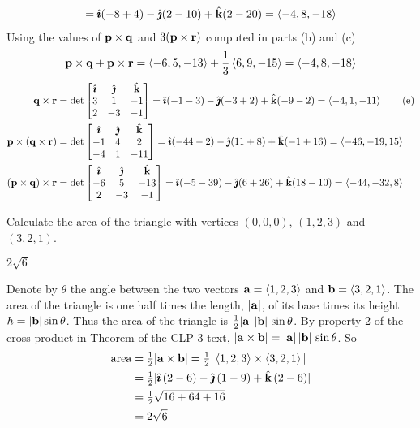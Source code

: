 \begin{solution}
\begin{align*}
=\hat{\pmb{\imath}}(-8+4)-\hat{\pmb{\jmath}}(2-10)
+\hat{\mathbf{k}}(2-20) 
=  \left< -4,8,-18\right> 
\end{align*}
{\phantom{(d)}}
Using the values of $\mathbf{p}\times\mathbf{q}$ and $3(\mathbf{p}\times\mathbf{r})$ computed
in parts (b) and (c)
\begin{equation*}
\mathbf{p}\times\mathbf{q}+\mathbf{p}\times\mathbf{r}=\left< -6,5,-13\right> +\frac{1}{3}\left< 6,9,-15\right> 
 = \left< -4,8,-18\right>
\end{equation*}
\begin{align}
\vq\times\vr 
&= \det\left[\begin{matrix}\hi&\hj&\hk\cr3&1&-1\cr2&-3&-1\end{matrix}\right]
=\hi(-1-3)-\hj(-3+2)
+\hk(-9-2) 
= \llt -4,1,-11\rgt \tag{e} \\
\vp\times(\vq\times\vr)
&= \det\left[\begin{matrix}\hi&\hj&\hk\cr-1&4&2\cr-4&1&-11\end{matrix}\right]
=\hi(-44-2)-\hj(11+8)
+\hk(-1+16) 
= \llt -46,-19,15\rgt \notag \\
%
(\vp\times\vq)\times\vr
&= \det\left[\begin{matrix}\hi&\hj&\hk\cr-6&5&-13\cr2&-3&-1\end{matrix}\right]
=\hi(-5-39)-\hj(6+26)
+\hk(18-10) 
= \llt -44,-32,8\rgt \notag
\end{align}
\reqnomode

\end{solution}

\begin{question}
Calculate the area of the triangle with vertices $(0,0,0)$,
$(1,2,3)$ and $(3,2,1)$.
\end{question}


\begin{answer}
$2\sqrt{6}$
\end{answer}

\begin{solution}
Denote by $\theta$ the angle between the two vectors
$\mathbf{a}=\left< 1,2,3\right>$ and $\mathbf{b}=\left< 3,2,1\right>$. The area of the triangle is one 
half times the length, $|\mathbf{a}|$, of its base times its height 
$h=|\mathbf{b}|\sin\theta$. 
%
Thus the area of the triangle is  $\tfrac{1}{2}|\mathbf{a}|\,|\mathbf{b}|\,\sin\theta$.
By property 2 of the cross product in Theorem 
of the CLP-3 text,
 $|\mathbf{a}\times\mathbf{b}|=|\mathbf{a}|\,|\mathbf{b}|\,\sin\theta$. So
\begin{align*}
\text{area} &= \tfrac{1}{2}|\mathbf{a}\times\mathbf{b}|
=\tfrac{1}{2}|\left< 1,2,3\right>\times\left< 3,2,1\right>| \\
&=\tfrac{1}{2} | \hat{\pmb{\imath}}\,(2-6)-\hat{\pmb{\jmath}}\,(1-9) +\hat{\mathbf{k}}\,(2-6)| \\
&=\tfrac{1}{2}\sqrt{16+64+16} \\
&=2\sqrt{6} 
\end{align*}
\end{solution}

